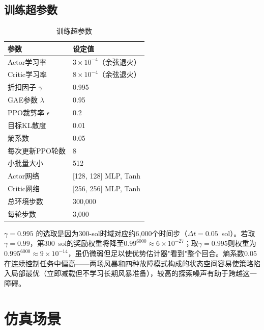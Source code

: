 \documentclass[11pt,a4paper]{ctexart}
\begin{document}
\subsection{训练超参数}

\begin{table}[H]
  \centering
  \caption{训练超参数}
  \label{tab:hparams}
  \begin{tabular}{@{}ll@{}}
    \toprule
    \textbf{参数} & \textbf{设定值} \\
    \midrule
    Actor学习率 & $3 \times 10^{-4}$（余弦退火） \\
    Critic学习率 & $8 \times 10^{-4}$（余弦退火） \\
    折扣因子 $\gamma$ & 0.995 \\
    GAE参数 $\lambda$ & 0.95 \\
    PPO裁剪率 $\epsilon$ & 0.2 \\
    目标KL散度 & 0.01 \\
    熵系数 & 0.05 \\
    每次更新PPO轮数 & 8 \\
    小批量大小 & 512 \\
    Actor网络 & [128, 128] MLP, Tanh \\
    Critic网络 & [256, 256] MLP, Tanh \\
    总环境步数 & 300,000 \\
    每轮步数 & 3,000 \\
    \bottomrule
  \end{tabular}
\end{table}

$\gamma = 0.995$ 的选取是因为300-sol时域对应约6,000个时间步（$\Delta t = 0.05$~sol）。若取$\gamma = 0.99$，第300~sol的奖励权重将降至$0.99^{6000} \approx 6 \times 10^{-27}$；取$\gamma = 0.995$则权重为$0.995^{6000} \approx 9 \times 10^{-14}$，虽仍微弱但足以使优势估计器"看到"整个回合。熵系数0.05在连续控制任务中偏高——两场风暴和四种故障模式构成的状态空间容易使策略陷入局部最优（立即减载但不学习长期风暴准备），较高的探索噪声有助于跨越这一障碍。

\section{仿真场景}
\end{document}
